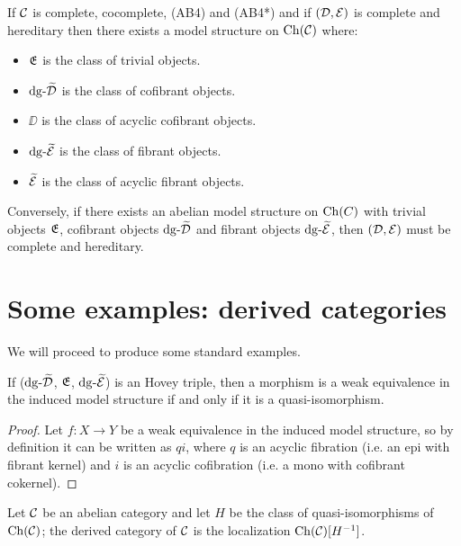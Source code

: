\begin{corollary}
    If $\mathcal{C}$ is complete, cocomplete, (AB4) and (AB4*) and if $(\mathcal{D}, \mathcal{E})$ is complete and hereditary then there exists a model structure on $\mathrm{Ch}(\mathcal{C})$ where:
    \begin{itemize}
        \itemsep0em 
        \item $\mathfrak{E}$ is the class of trivial objects.
        \item $\mathrm{dg} \text{-}\widetilde{\mathcal{D}}$ is the class of cofibrant objects.
        \item $\DD$ is the class of acyclic cofibrant objects.
        \item $\mathrm{dg} \text{-}\widetilde{\mathcal{E}}$ is the class of fibrant objects.
        \item $\widetilde{\mathcal{E}}$ is the class of acyclic fibrant objects.
    \end{itemize}
    Conversely, if there exists an abelian model structure on $\mathrm{Ch}(C)$ with trivial objects $\mathfrak{E}$, cofibrant objects $\mathrm{dg} \text{-}\widetilde{\mathcal{D}}$ and fibrant objects $\mathrm{dg} \text{-}\widetilde{\mathcal{E}}$, then $(\mathcal{D}, \mathcal{E})$ must be complete and hereditary.
\end{corollary}


\section{Some examples: derived categories}

We will proceed to produce some standard examples.





\begin{lemma}
    If ($\mathrm{dg} \text{-}\widetilde{\mathcal{D}}$, $\mathfrak{E}$, $\mathrm{dg} \text{-}\widetilde{\mathcal{E}}$) is an Hovey triple, then a morphism is a weak equivalence in the induced model structure if and only if it is a quasi-isomorphism.
\end{lemma}

\begin{proof}
    Let $f\colon X \longrightarrow Y$ be a weak equivalence in the induced model structure, so by definition it can be written as $qi$, where $q$ is an acyclic fibration (i.e. an epi with fibrant kernel) and $i$ is an acyclic cofibration (i.e. a mono with cofibrant cokernel).
\end{proof}


\begin{definition}
    Let $\mathcal{C}$ be an abelian category and let $H$ be the class of quasi-isomorphisms of $\mathrm{Ch}(\mathcal{C})$; the derived category of $\mathcal{C}$ is the localization $\mathrm{Ch}(\mathcal{C})[H^{-1}]$.
\end{definition}